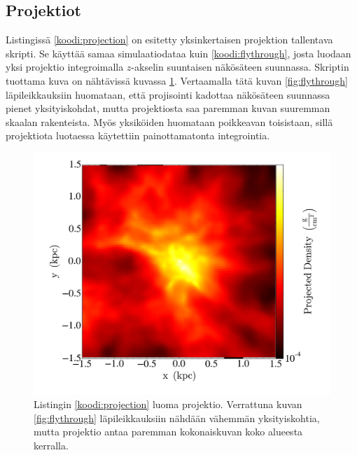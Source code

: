 \documentclass[12pt,a4paper]{article}
\begin{document}
\subsection{Projektiot}

Listingissä \ref{koodi:projection} on esitetty yksinkertaisen projektion tallentava skripti. Se käyttää samaa simulaatiodataa kuin \ref{koodi:flythrough}, josta luodaan yksi projektio integroimalla $z$-akselin suuntaisen näkösäteen suunnassa. Skriptin tuottama kuva on nähtävissä kuvassa \ref{fig:projection}. Vertaamalla tätä kuvan \ref{fig:flythrough} läpileikkauksiin huomataan, että projisointi kadottaa näkösäteen suunnassa pienet yksityiskohdat, mutta projektiosta saa paremman kuvan suuremman skaalan rakenteista. Myös yksiköiden huomataan poikkeavan toisistaan, sillä projektiota luotaessa käytettiin painottamatonta integrointia.


\begin{minipage}{\linewidth}

\end{minipage}

\begin{figure}
   \centering
   \includegraphics[width=.7\textwidth]{../kuvat/projection.png}
   \caption{Listingin \ref{koodi:projection} luoma projektio. Verrattuna kuvan \ref{fig:flythrough} läpileikkauksiin nähdään vähemmän yksityiskohtia, mutta projektio antaa paremman kokonaiskuvan koko alueesta kerralla.} \label{fig:projection}
\end{figure}
\end{document}
